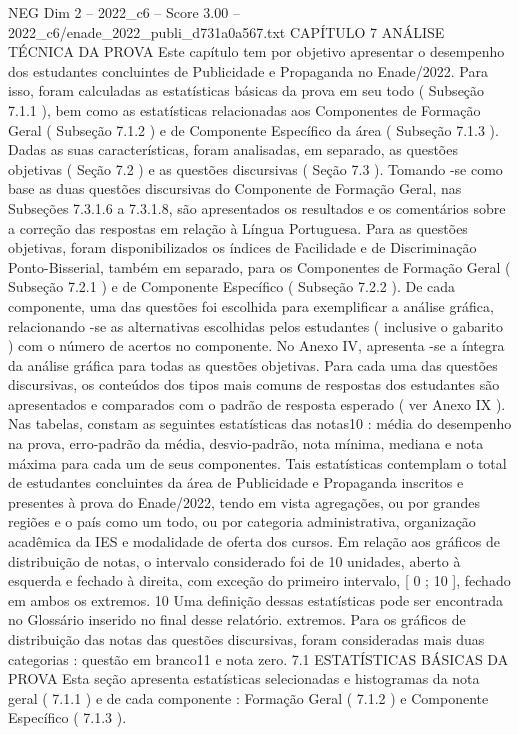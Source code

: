 \begin{textsample}{NEG Dim 2 – 2022\_c6 – Score 3.00 – 2022\_c6/enade\_2022\_publi\_d731a0a567.txt}  \label{ex:f2_neg_295}
CAPÍTULO 7 ANÁLISE TÉCNICA DA PROVA Este capítulo tem por objetivo apresentar o desempenho dos estudantes concluintes de Publicidade e Propaganda no Enade/2022.
Para isso, foram calculadas as estatísticas básicas da prova em seu todo ( Subseção 7.1.1 ), bem como as estatísticas relacionadas aos Componentes de Formação Geral ( Subseção 7.1.2 ) e de Componente Específico da área ( Subseção 7.1.3 ).
Dadas as suas características, foram analisadas, em separado, as questões objetivas ( Seção 7.2 ) e as questões discursivas ( Seção 7.3 ).
Tomando -se como base as duas questões discursivas do Componente de Formação Geral, nas Subseções 7.3.1.6 a 7.3.1.8, são apresentados os resultados e os comentários sobre a correção das respostas em relação à Língua Portuguesa.
Para as questões objetivas, foram disponibilizados os índices de Facilidade e de Discriminação Ponto-Bisserial, também em separado, para os Componentes de Formação Geral ( Subseção 7.2.1 ) e de Componente Específico ( Subseção 7.2.2 ).
De cada componente, uma das questões foi escolhida para exemplificar a análise gráfica, relacionando -se as alternativas escolhidas pelos estudantes ( inclusive o gabarito ) com o número de acertos no componente.
No Anexo IV, apresenta -se a íntegra da análise gráfica para todas as questões objetivas.
Para cada uma das questões discursivas, os conteúdos dos tipos mais comuns de respostas dos estudantes são apresentados e comparados com o padrão de resposta esperado ( ver Anexo IX ).
Nas tabelas, constam as seguintes estatísticas das notas10 : média do desempenho na prova, erro-padrão da média, desvio-padrão, nota mínima, mediana e nota máxima para cada um de seus componentes.
Tais estatísticas contemplam o total de estudantes concluintes da área de Publicidade e Propaganda inscritos e presentes à prova do Enade/2022, tendo em vista agregações, ou por grandes regiões e o país como um todo, ou por categoria administrativa, organização acadêmica da IES e modalidade de oferta dos cursos.
Em relação aos gráficos de distribuição de notas, o intervalo considerado foi de 10 unidades, aberto à esquerda e fechado à direita, com exceção do primeiro intervalo, [ 0 ; 10 ], fechado em ambos os extremos. 10 Uma definição dessas estatísticas pode ser encontrada no Glossário inserido no final desse relatório. extremos.
Para os gráficos de distribuição das notas das questões discursivas, foram consideradas mais duas categorias : questão em branco11 e nota zero. 7.1 ESTATÍSTICAS BÁSICAS DA PROVA Esta seção apresenta estatísticas selecionadas e histogramas da nota geral ( 7.1.1 ) e de cada componente : Formação Geral ( 7.1.2 ) e Componente Específico ( 7.1.3 ).

\end{textsample}
